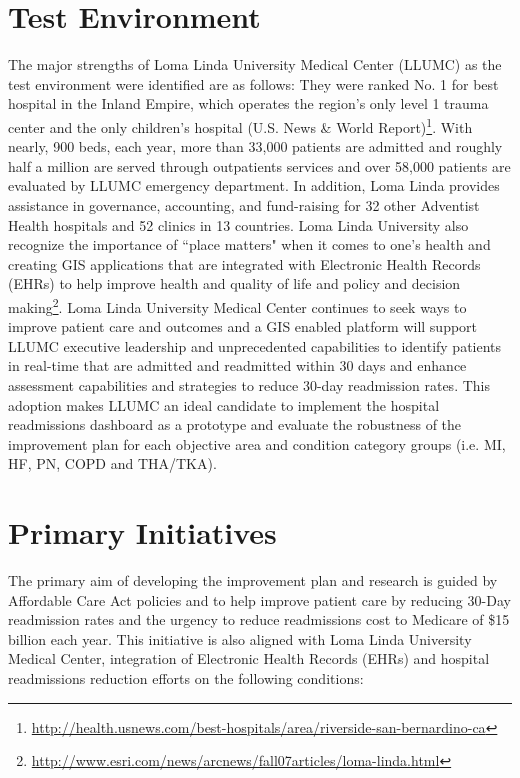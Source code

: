 \documentclass[11pt]{article}\usepackage[]{graphicx}\usepackage[]{color}
\begin{document}
\section{Test  Environment}
The major strengths of Loma Linda University Medical Center (LLUMC) as the test environment were identified are as follows: They were ranked No. 1 for best hospital in the Inland Empire, which operates the region's only level 1 trauma center and the only children's hospital (U.S. News & World Report)\footnote{\url{http://health.usnews.com/best-hospitals/area/riverside-san-bernardino-ca}}. With nearly, 900 beds, each year, more than 33,000 patients are admitted and roughly half a million are served through outpatients services and over 58,000 patients are evaluated by LLUMC emergency department. In addition, Loma Linda provides assistance in governance, accounting, and fund-raising for 32 other Adventist Health hospitals and 52 clinics in 13 countries. Loma Linda University also recognize the importance of ``place matters" when it comes to one's health and creating GIS applications that are integrated with Electronic Health Records (EHRs) to help improve health and quality of life and policy and decision making\footnote{\url{http://www.esri.com/news/arcnews/fall07articles/loma-linda.html}}. Loma Linda University Medical Center continues to seek ways to improve patient care and outcomes and a GIS enabled platform will support LLUMC executive leadership and unprecedented capabilities to identify patients in real-time that are admitted and readmitted within 30 days and enhance assessment capabilities and strategies to reduce 30-day readmission rates. This adoption makes LLUMC an ideal candidate to implement the hospital readmissions dashboard as a  prototype and evaluate the robustness of the improvement plan for each objective area and condition category groups (i.e. MI, HF, PN, COPD and THA/TKA).


\section{Primary Initiatives}

The primary aim of developing the improvement plan and research is guided by Affordable Care Act policies and to help improve patient care by reducing 30-Day readmission rates and the urgency to reduce readmissions cost to Medicare of \$15 billion each year. This initiative is also aligned with Loma Linda University Medical Center, integration of Electronic Health Records (EHRs) and hospital readmissions reduction efforts on the following conditions:
\end{document}
